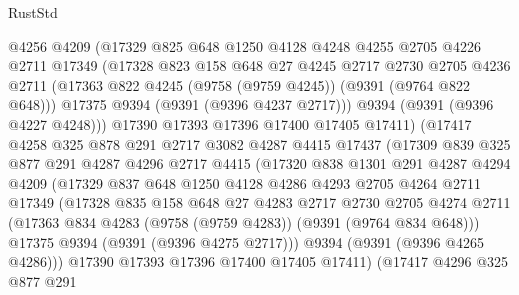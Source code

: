 \begin{lexlean}{RustStd}
\begin{coremodule}
              @4256
              @4209
              (@17329
                @825
                @648
                @1250
                @4128
                @4248
                @4255
                @2705
                @4226
                @2711
                @17349
                (@17328
                  @823
                  @158
                  @648
                  @27
                  @4245
                  @2717
                  @2730
                  @2705
                  @4236
                  @2711
                  (@17363 @822 @4245 (@9758 (@9759 @4245)) (@9391 (@9764 @822 @648)))
                  @17375
                  @9394
                  (@9391 (@9396 @4237 @2717)))
                @9394
                (@9391 (@9396 @4227 @4248)))
              @17390
              @17393
              @17396
              @17400
              @17405
              @17411)
            (@17417
              @4258
              @325
              @878
              @291
              @2717
              @3082
              @4287
              @4415
              @17437
              (@17309
                @839
                @325
                @877
                @291
                @4287
                @4296
                @2717
                @4415
                (@17320
                  @838
                  @1301
                  @291
                  @4287
                  @4294
                  @4209
                  (@17329
                    @837
                    @648
                    @1250
                    @4128
                    @4286
                    @4293
                    @2705
                    @4264
                    @2711
                    @17349
                    (@17328
                      @835
                      @158
                      @648
                      @27
                      @4283
                      @2717
                      @2730
                      @2705
                      @4274
                      @2711
                      (@17363 @834 @4283 (@9758 (@9759 @4283)) (@9391 (@9764 @834 @648)))
                      @17375
                      @9394
                      (@9391 (@9396 @4275 @2717)))
                    @9394
                    (@9391 (@9396 @4265 @4286)))
                  @17390
                  @17393
                  @17396
                  @17400
                  @17405
                  @17411)
                (@17417
                  @4296
                  @325
                  @877
                  @291

\end{coremodule}
\end{lexlean}
